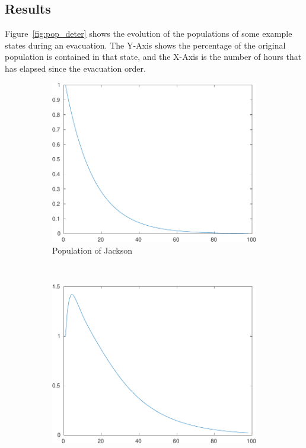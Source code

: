 \documentclass[titlepage]{article}
\begin{document}
  \subsection{Results}
      Figure~\ref{fig:pop_deter} shows the evolution of the populations of some example states during an evacuation. The Y-Axis shows the percentage of the original population is contained in that state, and the X-Axis is the number of hours that has elapsed since the evacuation order.
    \begin{figure}
      \center
      \begin{subfigure}[b]{0.3\textwidth}
        \center
        \includegraphics[width=\textwidth]{figures/pop_county_29-crop.pdf}
        \caption{Population of Jackson}
        \label{fig:pop_county60}
      \end{subfigure}~
      \begin{subfigure}[b]{0.3\textwidth}
        \center
        \includegraphics[width=\textwidth]{figures/pop_county_39-crop.pdf}

\end{subfigure}
\end{figure}
\end{document}

